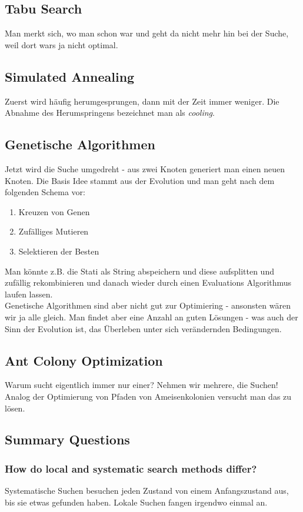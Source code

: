\subsection{Tabu Search}
Man merkt sich, wo man schon war und geht da nicht mehr hin bei der Suche, weil dort wars ja nicht optimal.
\subsection{Simulated Annealing}
Zuerst wird häufig herumgesprungen, dann mit der Zeit immer weniger. Die Abnahme des Herumspringens bezeichnet man als \textit{cooling}. 
\subsection{Genetische Algorithmen}
Jetzt wird die Suche umgedreht - aus zwei Knoten generiert man einen neuen Knoten. Die Basis Idee stammt aus der Evolution und man geht nach dem folgenden Schema vor:
\begin{enumerate}
	\item Kreuzen von Genen
	\item Zufälliges Mutieren
	\item Selektieren der Besten
\end{enumerate}
Man könnte z.B. die Stati als String abspeichern und diese aufsplitten und zufällig rekombinieren und danach wieder durch einen Evaluations Algorithmus laufen lassen. \\ \newline
Genetische Algorithmen sind aber nicht gut zur Optimiering - ansonsten wären wir ja alle gleich. Man findet aber eine Anzahl an guten Lösungen - was auch der Sinn der Evolution ist, das Überleben unter sich verändernden Bedingungen.
\subsection{Ant Colony Optimization}
Warum sucht eigentlich immer nur einer? Nehmen wir mehrere, die Suchen! Analog der Optimierung von Pfaden von Ameisenkolonien versucht man das zu lösen.
\subsection{Summary Questions}
\subsubsection{How do local and systematic search methods differ?}
Systematische Suchen besuchen jeden Zustand von einem Anfangszustand aus, bis sie etwas gefunden haben. Lokale Suchen fangen irgendwo einmal an.
